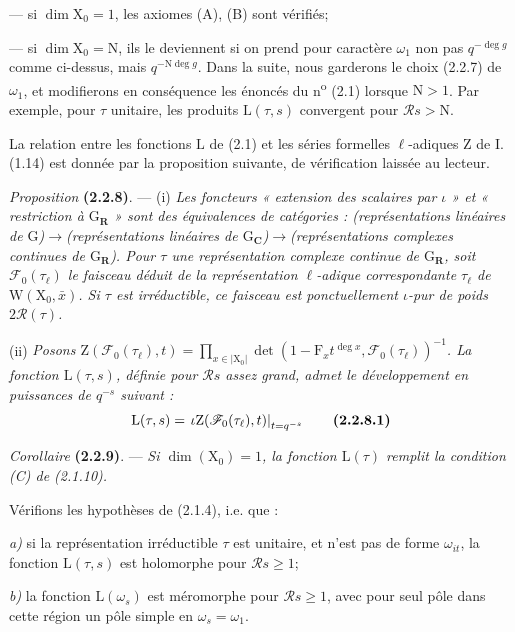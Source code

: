 \documentclass[11pt,leqno]{article}
\begin{document}
— si \(\dim\mathrm X_0=1\), les axiomes (A), (B) sont vérifiés;

— si \(\dim\mathrm X_0=\mathrm N\), ils le deviennent si on prend pour caractère \(\omega_1\) non pas \(q^{-\deg g}\) comme ci-dessus, mais \(q^{-\mathrm N\deg g}\). Dans la suite, nous garderons le choix (2.2.7) de \(\omega_1\), et modifierons en conséquence les énoncés du n\textsuperscript{o} (2.1) lorsque \(\mathrm N>1\). Par exemple, pour \(\tau\) unitaire, les produits \(\mathrm L(\tau,s)\) convergent pour \(\mathscr R s>\mathrm N\).

La relation entre les fonctions \(\mathrm L\) de (2.1) et les séries formelles \(\ell\)-adiques \(\mathrm Z\) de I.\,(1.14) est donnée par la proposition suivante, de vérification laissée au lecteur.

\textit{Proposition} \textbf{(2.2.8)}. — (i) \textit{Les foncteurs « extension des scalaires par \(\iota\) » et « restriction à \(\mathrm G_{\mathbf R}\) » sont des équivalences de catégories : (représentations linéaires de \(\mathrm G\))\(\to\)(représentations linéaires de \(\mathrm G_{\mathbf C}\))\(\to\)(représentations complexes continues de \(\mathrm G_{\mathbf R}\)). Pour \(\tau\) une représentation complexe continue de \(\mathrm G_{\mathbf R}\), soit \(\mathscr F_0(\tau_\ell)\) le faisceau déduit de la représentation \(\ell\)-adique correspondante \(\tau_\ell\) de \(\mathrm W(\mathrm X_0,\bar{x})\). Si \(\tau\) est irréductible, ce faisceau est ponctuellement \(\iota\)-pur de poids \(2\mathscr R(\tau)\).}

(ii) \textit{Posons \(\mathrm Z(\mathscr F_0(\tau_\ell),t)=\prod\limits_{x\in|\mathrm X_0|}\det(1-\mathrm F_xt^{\deg x},\mathscr F_0(\tau_\ell))^{-1}\). La fonction \(\mathrm L(\tau,s)\), définie pour \(\mathscr R s\) assez grand, admet le développement en puissances de \(q^{-s}\) suivant :}
\[
\mathrm L(\tau,s)
=\left.\iota\mathrm Z(\mathscr F_0(\tau_\ell),t)\right|_{t=q^{-s}}
\tag*{\textbf{(2.2.8.1)}}
\]

\textit{Corollaire} \textbf{(2.2.9)}. — \textit{Si \(\dim(\mathrm X_0)=1\), la fonction \(\mathrm L(\tau)\) remplit la condition \textup{(C)} de \textup{(2.1.10)}.}

Vérifions les hypothèses de (2.1.4), i.e. que :

\textit{a)} si la représentation irréductible \(\tau\) est unitaire, et n’est pas de forme \(\omega_{it}\), la fonction \(\mathrm L(\tau,s)\) est holomorphe pour \(\mathscr R s\geq1\);

\textit{b)} la fonction \(\mathrm L(\omega_s)\) est méromorphe pour \(\mathscr R s\geq1\), avec pour seul pôle dans cette région un pôle simple en \(\omega_s=\omega_1\).
\end{document}
